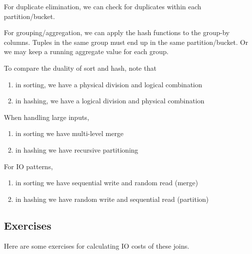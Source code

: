 \documentclass{article}
\begin{document}
      For duplicate elimination, we can check for duplicates within each partition/bucket. 

      For grouping/aggregation, we can apply the hash functions to the group-by columns. Tuples in the same group must end up in the same partition/bucket. Or we may keep a running aggregate value for each group. 

      To compare the duality of sort and hash, note that 
      \begin{enumerate}
        \item in sorting, we have a physical division and logical combination 
        \item in hashing, we have a logical division and physical combination
      \end{enumerate}
      When handling large inputs, 
      \begin{enumerate}
        \item in sorting we have multi-level merge 
        \item in hashing we have recursive partitioning 
      \end{enumerate}
      For IO patterns, 
      \begin{enumerate}
        \item in sorting we have sequential write and random read (merge) 
        \item in hashing we have random write and sequential read (partition) 
      \end{enumerate}

  \subsection{Exercises} 

    Here are some exercises for calculating IO costs of these joins. 
\end{document}
